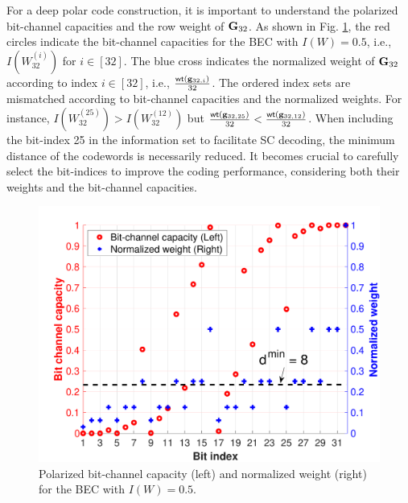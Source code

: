 \documentclass[conference]{IEEEtran}
\begin{document}
For a deep polar code construction, it is important to understand the polarized bit-channel capacities and the row weight of ${\bf G}_{32}$. As shown in Fig. \ref{fig:rateprofiling}, the red circles indicate the bit-channel capacities for the BEC with $I(W)=0.5$, i.e., $I\left(W_{32}^{(i)}\right)$ for $i\in [32]$. The blue cross indicates the normalized weight of ${\bf G}_{32}$ according to index $i\in [32]$, i.e., $\frac{{\sf wt}({\bf g}_{32,i})}{32}$. The ordered index sets are mismatched according to bit-channel capacities and the normalized weights. For instance, $I\left(W_{32}^{(25)}\right)> I\left(W_{32}^{(12)}\right)$ but $\frac{{\sf wt}({\bf g}_{32,25})}{32} < \frac{{\sf wt}({\bf g}_{32,12})}{32}$.  When including the bit-index 25 in the information set to facilitate SC decoding, the minimum distance of the codewords is necessarily reduced. It becomes crucial to carefully select the bit-indices to improve the coding performance, considering both their weights and the bit-channel capacities. 



\begin{figure}[t]
\centering
\includegraphics[width=1\columnwidth]{RateProfiling.pdf}
\caption{Polarized bit-channel capacity (left) and normalized weight (right) for the BEC with $I(W)=0.5$.}
\label{fig:rateprofiling}
\end{figure}

 
\end{document}
